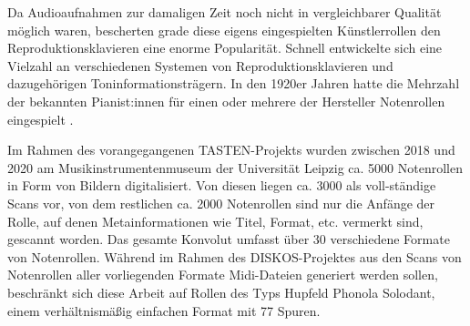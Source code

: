 Da Audioaufnahmen zur damaligen Zeit noch nicht in vergleichbarer Qualität möglich waren, bescherten grade diese eigens eingespielten Künstlerrollen den Reproduktionsklavieren eine enorme Popularität.
Schnell entwickelte sich eine Vielzahl an verschiedenen Systemen von Reproduktionsklavieren und dazugehörigen Toninformationsträgern.
In den 1920er Jahren hatte die Mehrzahl der bekannten Pianist:innen für einen oder mehrere der Hersteller Notenrollen eingespielt \parencite[11]{bowers_1972}.

Im Rahmen des vorangegangenen TASTEN-Projekts wurden zwischen 2018 und 2020 am Musikinstrumentenmuseum der Universität Leipzig ca. 5000 Notenrollen in Form von Bildern digitalisiert.
Von diesen liegen ca. 3000 als voll-ständige Scans vor, von dem restlichen ca. 2000 Notenrollen sind nur die Anfänge der Rolle, auf denen Metainformationen wie Titel, Format, etc. vermerkt sind, gescannt worden.
Das gesamte Konvolut umfasst über 30 verschiedene Formate von Notenrollen.
Während im Rahmen des DISKOS-Projektes aus den Scans von Notenrollen aller vorliegenden Formate Midi-Dateien generiert werden sollen, beschränkt sich diese Arbeit auf Rollen des Typs Hupfeld Phonola Solodant, einem verhältnismäßig einfachen Format mit 77 Spuren.

\pagebreak